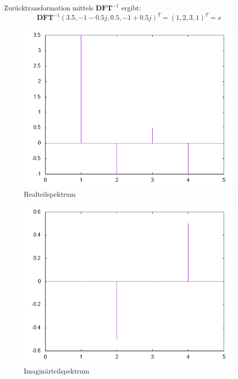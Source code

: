     Zurücktransformation mittels $\textbf{DFT}^{-1}$ ergibt:
    \[
        \textbf{DFT}^{-1} (3.5, -1 - 0.5j, 0.5, -1 + 0.5j)^T = (1, 2, 3, 1)^T = s
    \]
    \begin{figure}[h]
        \includegraphics[width=\textwidth]{re_spectrum.png}
        \caption{Realteilspektrum}
    \end{figure}
    \begin{figure}[h]
        \includegraphics[width=\textwidth]{im_spectrum.png}
        \caption{Imaginärteilspektrum}
    \end{figure}

